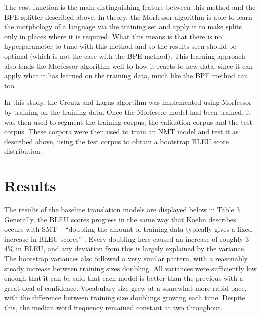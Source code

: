 \documentclass[11pt]{article}
\begin{document}
\bigskip

The cost function is the main distinguishing feature between this method and the BPE splitter described above. In theory, the Morfessor algorithm is able to learn the morphology of a language via the training set and apply it to make splits only in places where it is required. What this means is that there is no hyperparameter to tune with this method and so the results seen should be optimal (which is not the case with the BPE method). This learning approach also lends the Morfessor algorithm well to how it reacts to new data, since it can apply what it has learned on the training data, much like the BPE method can too. 

\bigskip

In this study, the Creutz and Lagus algortihm was implemented using Morfessor by training on the training data. Once the Morfessor model had been trained, it was then used to segment the training corpus, the validation corpus and the test corpus. These corpora were then used to train an NMT model and test it as described above, using the test corpus to obtain a bootstrap BLEU score distribution.

\newpage

\section{Results}

The results of the baseline translation models are displayed below in Table 3. Generally, the BLEU scores progress in the same way that Koehn describes occurs with SMT -- ``doubling the amount of training data typically gives a fixed increase in BLEU scores'' \citep[p. 295]{koehn2020}. Every doubling here caused an increase of roughly 3-4\% in BLEU, and any deviation from this is largely explained by the variance. The bootstrap variances also followed a very similar pattern, with a reasonably steady increase between training sizes doubling. All variances were sufficiently low enough that it can be said that each model is better than the previous with a great deal of confidence. Vocabulary size grew at a somewhat more rapid pace, with the difference between training size doublings growing each time. Despite this, the median word frequency remained constant at two throughout.
\end{document}
